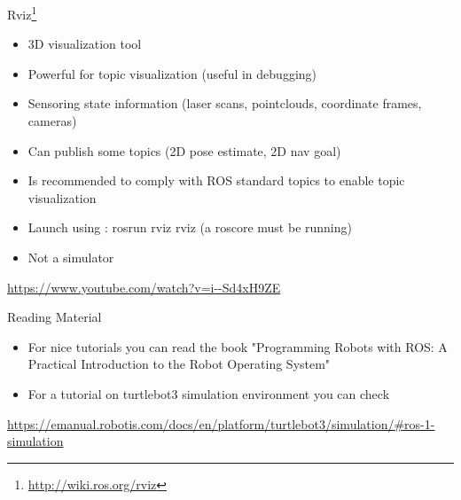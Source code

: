 \documentclass{beamer}
\begin{document}
\begin{frame}{Rviz\footnote{\url{http://wiki.ros.org/rviz}}}
	
	\begin{itemize}
		\item 3D visualization tool
		\item Powerful for topic visualization (useful in debugging)
		\item Sensoring state information (laser scans, pointclouds, coordinate frames, cameras)
		\item Can publish some topics (2D pose estimate, 2D nav goal)
		\item Is recommended to comply with ROS standard topics to enable topic visualization
		\item Launch using : rosrun rviz rviz (a roscore must be running)
		\item Not a simulator
	\end{itemize}
	
	\centering
	\url{https://www.youtube.com/watch?v=i--Sd4xH9ZE}
	
\end{frame}


\begin{frame}{Reading Material}
	
	\begin{itemize}
		\item For nice tutorials you can read the book "Programming Robots with ROS: A Practical Introduction to the Robot Operating System"
		\item For a tutorial on turtlebot3 simulation environment you can check 
	\end{itemize}
	\centering
	\url{https://emanual.robotis.com/docs/en/platform/turtlebot3/simulation/#ros-1-simulation}
	
\end{frame}




%	
%	
\end{document}
